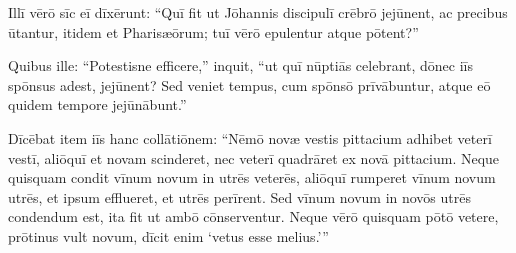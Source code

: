 \Versus Illī vērō sīc eī dīxērunt: ``Quī fit ut Jōhannis discipulī crēbrō jejūnent, ac precibus ūtantur, itidem et Pharisæōrum; tuī vērō epulentur atque pōtent?''

\Versus Quibus ille: ``Potestisne efficere,'' inquit, ``ut quī nūptiās celebrant, dōnec iīs spōnsus adest, jejūnent?
\Versus Sed veniet tempus, cum spōnsō prīvābuntur, atque eō quidem tempore jejūnābunt.''

\Versus Dīcēbat item iīs hanc collātiōnem: ``Nēmō novæ vestis pittacium adhibet veterī vestī, aliōquī et novam scinderet, nec veterī quadrāret ex novā pittacium.
\Versus Neque quisquam condit vīnum novum in utrēs veterēs, aliōquī rumperet vīnum novum utrēs, et ipsum efflueret, et utrēs perīrent.
\Versus Sed vīnum novum in novōs utrēs condendum est, ita fit ut ambō cōnserventur.
\Versus Neque vērō quisquam pōtō vetere, prōtinus vult novum, dīcit enim `vetus esse melius.'{}''


